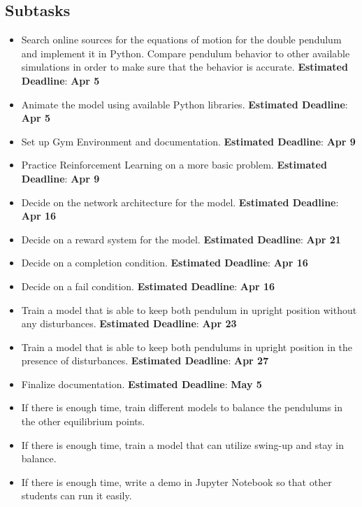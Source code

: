 \documentclass{article}
\begin{document}
\subsection{Subtasks}
	\begin{itemize}
		\item Search online sources for the equations of motion for the double pendulum and implement it in Python. Compare pendulum behavior to other available simulations in order to make sure that the behavior is accurate. \textbf{Estimated Deadline}: \textbf{Apr 5}
		\item Animate the model using available Python libraries. \textbf{Estimated Deadline}: \textbf{Apr 5}
		\item Set up Gym Environment and documentation. \textbf{Estimated Deadline}: \textbf{Apr 9}
		\item Practice Reinforcement Learning on a more basic problem. \textbf{Estimated Deadline}: \textbf{Apr 9}
		\item Decide on the network architecture for the model. \textbf{Estimated Deadline}: \textbf{Apr 16}
		\item Decide on a reward system for the model. \textbf{Estimated Deadline}: \textbf{Apr 21}
		\item Decide on a completion condition. \textbf{Estimated Deadline}: \textbf{Apr 16}
		\item Decide on a fail condition. \textbf{Estimated Deadline}: \textbf{Apr 16}
		\item Train a model that is able to keep both pendulum in upright position without any disturbances. \textbf{Estimated Deadline}: \textbf{Apr 23}
		\item Train a model that is able to keep both pendulums in upright position in the presence of disturbances. \textbf{Estimated Deadline}: \textbf{Apr 27}
		\item Finalize documentation. \textbf{Estimated Deadline}: \textbf{May 5}
		\item If there is enough time, train different models to balance the pendulums in the other equilibrium points. 
		\item If there is enough time, train a model that can utilize swing-up and stay in balance. 
		\item If there is enough time, write a demo in Jupyter Notebook so that other students can run it easily. 
	\end{itemize}
    
\end{document}
